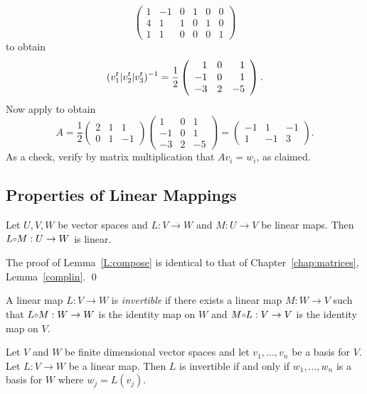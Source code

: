 \[
\left(\begin{array}{rrr|ccc}
1 & -1 & 0 & 1 & 0 & 0 \\
4 &  1 & 1 & 0 & 1 & 0 \\
1 &  1 & 0 & 0 & 0 & 1  \end{array}\right)
\]
to obtain
\[
(v_1^t|v_2^t|v_3^t)^{-1} = \frac{1}{2}\left(\begin{array}{rrr}
 1 & 0 &  1 \\
-1 & 0 &  1 \\
-3 & 2 & -5
\end{array}\right).
\]
Now apply  to obtain
\[
A = \frac{1}{2} \left(\begin{array}{rrr} 2 & 1 & 1\\ 0 & 1 & -1
\end{array}\right) \left(\begin{array}{rrr}
 1 & 0 &  1 \\
-1 & 0 &  1 \\
-3 & 2 & -5
\end{array}\right) = \left(\begin{array}{rrr} -1 & 1 & -1 \\ 1 & -1 & 3
\end{array}\right).
\]
As a check, verify by matrix multiplication that $Av_i=w_i$, as claimed.


\subsection*{Properties of Linear Mappings}

\begin{lemma} \label{L:compose}
Let $U,V,W$ be vector spaces and $L:V\to W$ and $M:U\to V$ be linear maps.
Then $L\compose M :U\to W$ is linear.
\end{lemma}

\proof The proof of Lemma~\ref{L:compose} is identical to that of
Chapter~\ref{chap:matrices}, Lemma~\ref{complin}. \qed

A linear map $L:V\to W$ is {\em invertible\/}  if there
exists a linear map $M:W\to V$ such that $L\compose M:W\to W$ is the identity
map on $W$ and $M\compose L:V\to V$ is the identity map on $V$.

\begin{thm} \label{T:invertbasis}
Let $V$ and $W$ be finite dimensional vector spaces and let $v_1,\ldots,v_n$
be a basis for $V$.  Let $L:V\to W$ be a linear map.
Then $L$ is invertible
if and only if $w_1,\ldots,w_n$ is a basis for $W$ where $w_j=L(v_j)$.
\end{thm}

